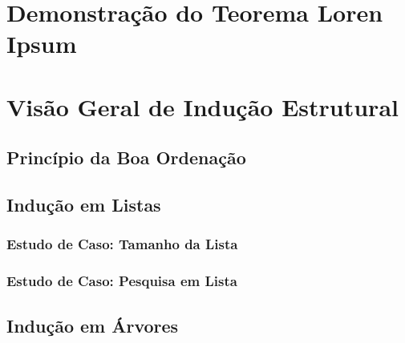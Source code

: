 \documentclass[times,english,brazilian,oneside,section=TITLE]{ifes8}
\begin{document}
\postextual




\apendices

\partapendices*

\chapter{Demonstração do Teorema Loren Ipsum}

\blindtext[7]


\chapter{Visão Geral de Indução Estrutural}

\section{Princípio da Boa Ordenação}

\blindtext[3]

\section{Indução em Listas}

\blindtext[2]

\subsection{Estudo de Caso: Tamanho da Lista}

\blindtext[2]

\subsection{Estudo de Caso: Pesquisa em Lista}

\blindtext[2]

\section{Indução em Árvores}
\end{document}
